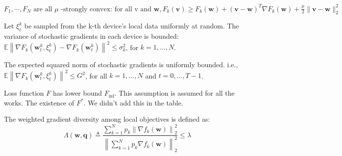 \begin{assumption}
$	F_{1}, \cdots, F_{N} \text { are all } \mu \text { -strongly convex: for all v and } \mathbf{w}, F_{k}(\mathbf{v}) \geq F_{k}(\mathbf{w})+(\mathbf{v}-\mathbf{w})^{T} \nabla F_{k}(\mathbf{w})+\frac{\mu}{2}\|\mathbf{v}-\mathbf{w}\|_{2}^{2}$
\label{ass:stroncvx}
\end{assumption}

\begin{assumption}
Let $\xi_{t}^{k}$ be sampled from the k-th device's local data uniformly at random. The variance of stochastic gradients in each device is bounded:
$\mathbb{E}\left\|\nabla F_{k}\left(\mathbf{w}_{t}^{k}, \xi_{t}^{k}\right)-\nabla F_{k}\left(\mathbf{w}_{t}^{k}\right)\right\|^{2} \leq \sigma_{k}^{2}$, for $k = 1,..., N$.
\label{ass:lgradvar}
\end{assumption}

\begin{assumption}
The expected squared norm of stochastic gradients is uniformly bounded. i.e.,
$\mathbb{E}\left\|\nabla F_{k}\left(\mathbf{w}_{t}^{k}, \xi_{t}^{k}\right)\right\|^{2} \leq G^{2}$, for all $k = 1,..., N$ and $t=0, \dots, T-1$.
\label{ass:squaregrad}
\end{assumption}

\begin{assumption}
	Loss function $F$ has lower bound $F_{\inf}$. This assumption is assumed for all the works.  The existence of $F^*$. We didn't add this 
	in the table.
	\label{ass:flb}
\end{assumption}

\begin{assumption}
	The weighted gradient diversity among local objectives is defined as:
$$
\Lambda(\boldsymbol{w}, \boldsymbol{q}) \triangleq \frac{\sum_{k=1}^{N} p_{k}\left\|\nabla f_{k}(\boldsymbol{w})\right\|_{2}^{2}}{\left\|\sum_{k=1}^{N} p_{k} \nabla f_{k}(\boldsymbol{w})\right\|_{2}^{2}} \leq \lambda
$$
\label{ass:bgd}
\end{assumption}

